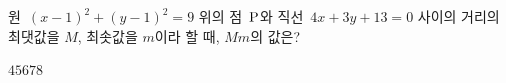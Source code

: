 원~$(x-1)^2+(y-1)^2=9$ 위의 점~$\mathrm{P}$와 직선~$4x+3y+13=0$ 사이의 거리의 최댓값을 $M$, 최솟값을 $m$이라 할 때, $Mm$의 값은?
\begin{choices32}{$4$}{$5$}{$6$}{$7$}{$8$}\end{choices32}
